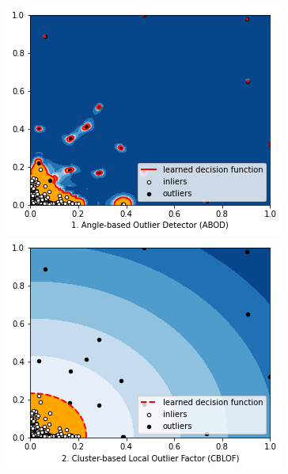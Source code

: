 \documentclass[12pt,twoside]{report}
\begin{document}
\begin{figure}[H]
\begin{multicols}{2}
    \includegraphics[width=\linewidth]{../code/figures/abod.png}\par 
    \includegraphics[width=\linewidth]{../code/figures/cblof.png}\par 
\end{multicols}
\label{fig:abod-cblof}
\end{figure}
\end{document}
